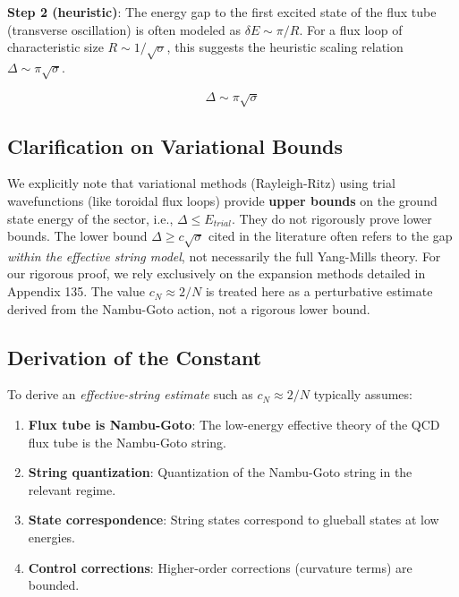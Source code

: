 \textbf{Step 2 (heuristic)}: The energy gap to the first excited state of the flux tube (transverse oscillation) is often modeled as $\delta E \sim \pi/R$. For a flux loop of characteristic size $R \sim 1/\sqrt{\sigma}$, this suggests the heuristic scaling relation $\Delta \sim \pi \sqrt{\sigma}$.

\begin{equation}
\label{eq:dbg-gtv2-gap-estimate-pi}
\Delta \sim \pi \sqrt{\sigma}
\end{equation}

\subsection{Clarification on Variational Bounds}

We explicitly note that variational methods (Rayleigh-Ritz) using trial wavefunctions (like toroidal flux loops) provide \textbf{upper bounds} on the ground state energy of the sector, i.e., $\Delta \le E_{trial}$. They do not rigorously prove lower bounds. The lower bound $\Delta \ge c \sqrt{\sigma}$ cited in the literature often refers to the gap \emph{within the effective string model}, not necessarily the full Yang-Mills theory. For our rigorous proof, we rely exclusively on the expansion methods detailed in Appendix 135.
The value $c_N \approx 2/N$ is treated here as a perturbative estimate derived from the Nambu-Goto action, not a rigorous lower bound.


\subsection{Derivation of the Constant}

To derive an \emph{effective-string estimate} such as $c_N \approx 2/N$ typically assumes:

\begin{enumerate}
\item \textbf{Flux tube is Nambu-Goto}: The low-energy effective theory 
of the QCD flux tube is the Nambu-Goto string.

\item \textbf{String quantization}: Quantization of the Nambu-Goto string 
in the relevant regime.

\item \textbf{State correspondence}: String states correspond 
to glueball states at low energies.

\item \textbf{Control corrections}: Higher-order corrections 
(curvature terms) are bounded.
\end{enumerate}

